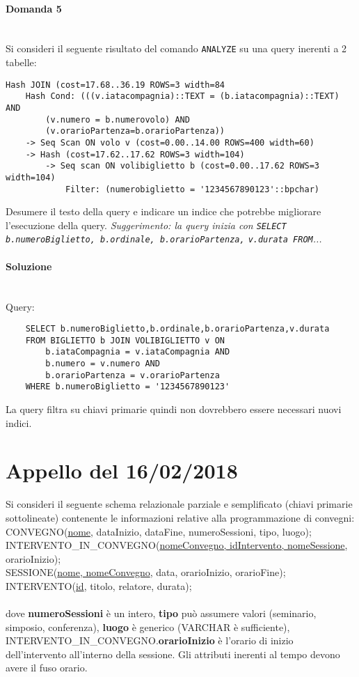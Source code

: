 \documentclass[a4paper, 10pt, titlepage]{article}
\begin{document}
\paragraph{Domanda 5}\dotfill
\\Si consideri il seguente risultato del comando \lstinline|ANALYZE| su una query inerenti a 2 tabelle:
\begin{small}
\begin{lstlisting}
Hash JOIN (cost=17.68..36.19 ROWS=3 width=84
	Hash Cond: (((v.iatacompagnia)::TEXT = (b.iatacompagnia)::TEXT) AND 
		(v.numero = b.numerovolo) AND
		(v.orarioPartenza=b.orarioPartenza))
	-> Seq Scan ON volo v (cost=0.00..14.00 ROWS=400 width=60)
	-> Hash (cost=17.62..17.62 ROWS=3 width=104)
		-> Seq scan ON volibiglietto b (cost=0.00..17.62 ROWS=3 width=104)
			Filter: (numerobiglietto = '1234567890123'::bpchar)
\end{lstlisting}
\end{small}
Desumere il testo della query e indicare un indice che potrebbe migliorare l'esecuzione della query. \textit{Suggerimento: la query inizia con {\small \lstinline|SELECT b.numeroBiglietto, b.ordinale, b.orarioPartenza,| \lstinline|v.durata FROM|...}}
\paragraph{Soluzione}\dotfill
\\Query:
\begin{lstlisting}
	SELECT b.numeroBiglietto,b.ordinale,b.orarioPartenza,v.durata
	FROM BIGLIETTO b JOIN VOLIBIGLIETTO v ON 
		b.iataCompagnia = v.iataCompagnia AND
		b.numero = v.numero AND
		b.orarioPartenza = v.orarioPartenza
	WHERE b.numeroBiglietto = '1234567890123'
\end{lstlisting}
La query filtra su chiavi primarie quindi non dovrebbero essere necessari nuovi indici. 

\newpage

\section{Appello del 16/02/2018}
Si consideri il seguente schema relazionale parziale e semplificato (chiavi primarie sottolineate) contenente le informazioni relative alla programmazione di convegni: \medskip \\
CONVEGNO(\underline{nome}, dataInizio, dataFine, numeroSessioni, tipo, luogo);\\
INTERVENTO\_IN\_CONVEGNO(\underline{nomeConvegno, idIntervento, nomeSessione}, orarioInizio);\\
SESSIONE(\underline{nome, nomeConvegno}, data, orarioInizio, orarioFine);\\
INTERVENTO(\underline{id}, titolo, relatore, durata);\\
\\
dove \textbf{numeroSessioni} è un intero, \textbf{tipo} può assumere valori (seminario, simposio, conferenza), \textbf{luogo} è generico (VARCHAR è sufficiente), INTERVENTO\_IN\_CONVEGNO.\textbf{orarioInizio} è l'orario di inizio dell'intervento all'interno della sessione. Gli attributi inerenti al tempo devono avere il fuso orario.
\end{document}
